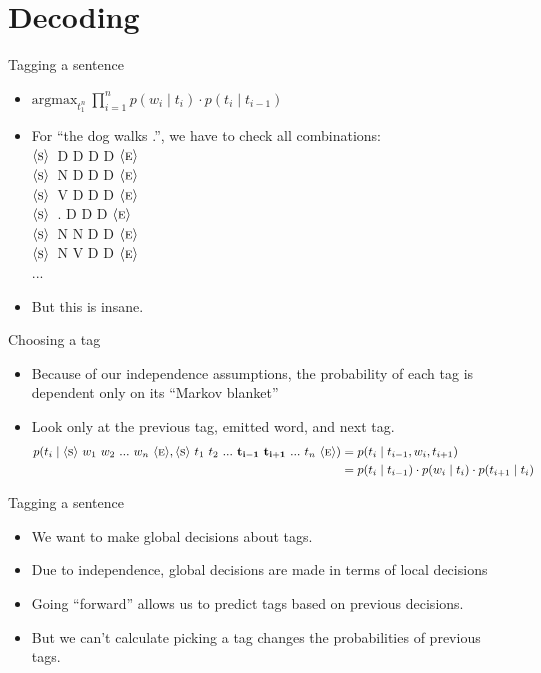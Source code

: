 \documentclass[11pt,letterpaper]{article}
\newcommand{\ngramstart}{\ensuremath{\langle \textsc{s} \rangle}}
\newcommand{\ngramend}{\ensuremath{\langle \textsc{e} \rangle}}
\begin{document}
\section{Decoding}

Tagging a sentence

\begin{itemize}
  \item $\text{argmax}_{t_1^n}~\prod_{i=1}^n p(w_i \mid t_i) \cdot p(t_i \mid t_{i-1})$
  \item For ``the dog walks .'', we have to check all combinations: \vspace{2mm} \\
        \ngramstart\ D D D D \ngramend  \vspace{2mm} \\
        \ngramstart\ N D D D \ngramend  \vspace{2mm} \\
        \ngramstart\ V D D D \ngramend  \vspace{2mm} \\
        \ngramstart\ . D D D \ngramend  \vspace{2mm} \\
        \ngramstart\ N N D D \ngramend  \vspace{2mm} \\
        \ngramstart\ N V D D \ngramend  \vspace{2mm} \\
        ...
  \item But this is insane.
\end{itemize}

Choosing a tag

\begin{itemize}
  \item Because of our independence assumptions, the probability of each tag is dependent only on its ``Markov blanket''
  \item Look only at the previous tag, emitted word, and next tag.  
    \begin{align*} p(t_i \mid \ngramstart~w_1~w_2~...~w_n~\ngramend, \ngramstart~t_1~t_2~...~\mathbf{t_{i-1}~t_{i+1}}~...~t_n~\ngramend)
       &= p(t_i \mid t_{i-1}, w_i, t_{i+1}) \\
       &= p(t_i \mid t_{i-1}) \cdot p(w_i \mid t_i) \cdot p(t_{i+1} \mid t_i)
    \end{align*}
\end{itemize}

Tagging a sentence

\begin{itemize}
  \item We want to make global decisions about tags.
  \item Due to independence, global decisions are made in terms of local decisions
  \item Going ``forward'' allows us to predict tags based on previous decisions.
  \item But we can't calculate picking a tag changes the probabilities of previous tags.
\end{itemize}
\end{document}
